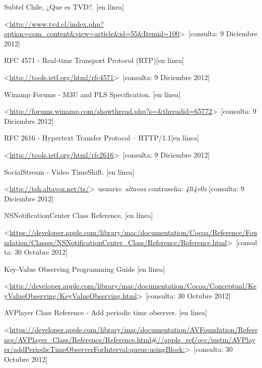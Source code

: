 
\begin{thebibliography}{99}
\begin{sloppypar}


%
Subtel Chile, ¿Que es TVD?. [en línea]\

\textless \url{http://www.tvd.cl/index.php?option=com_content&view=article&id=55&Itemid=100}\textgreater \ [consulta: 9 Diciembre 2012]

%
RFC 4571 - Real-time Transport Protocol (RTP)[en línea]\

\textless \url{http://tools.ietf.org/html/rfc4571}\textgreater \ [consulta: 9 Diciembre 2012]

%
Winamp Forums - M3U and PLS Specification. [en línea]\

\textless \url{http://forums.winamp.com/showthread.php?s=&threadid=65772}\textgreater \ [consulta: 9 Diciembre 2012]

%
RFC 2616 - Hypertext Transfer Protocol -- HTTP/1.1[en línea]\

\textless \url{http://tools.ietf.org/html/rfc2616}\textgreater \ [consulta: 9 Diciembre 2012]

%
SocialStream - Video TimeShift. [en línea]\

\textless \url{http://tsh.altavoz.net/ts/}\textgreater \ usuario: \textit{altavoz} contraseña: \textit{4lt4v0z} [consulta: 9 Diciembre 2012]

%
NSNotificationCenter Class Reference. [en línea]\

\textless \url{https://developer.apple.com/library/mac/documentation/Cocoa/Reference/Foundation/Classes/NSNotificationCenter_Class/Reference/Reference.html}\textgreater \ [consulta: 30 Octubre 2012]

Key-Value Observing Programming Guide [en línea]\

\textless \url{http://developer.apple.com/library/mac/documentation/Cocoa/Conceptual/KeyValueObserving/KeyValueObserving.html}\textgreater \ [consulta: 30 Octubre 2012]

%
AVPlayer Class Reference - Add periodic time observer. [en línea]\

\textless \url{https://developer.apple.com/library/mac/documentation/AVFoundation/Reference/AVPlayer_Class/Reference/Reference.html\#//apple_ref/occ/instm/AVPlayer/addPeriodicTimeObserverForInterval:queue:usingBlock:}\textgreater \ [consulta: 30 Octubre 2012]



\end{sloppypar}
\end{thebibliography}

